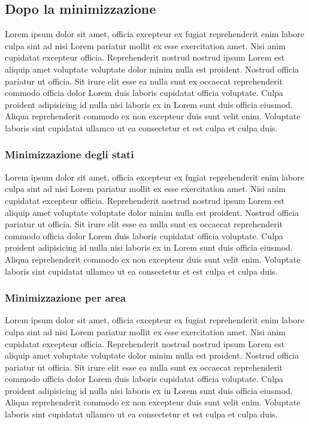 \documentclass[a4paper]{article}
\begin{document}
\subsection{Dopo la minimizzazione}
Lorem ipsum dolor sit amet, officia excepteur ex fugiat reprehenderit enim labore culpa sint ad nisi Lorem pariatur mollit ex esse exercitation amet. Nisi anim cupidatat excepteur officia. Reprehenderit nostrud nostrud ipsum Lorem est aliquip amet voluptate voluptate dolor minim nulla est proident. Nostrud officia pariatur ut officia. Sit irure elit esse ea nulla sunt ex occaecat reprehenderit commodo officia dolor Lorem duis laboris cupidatat officia voluptate. Culpa proident adipisicing id nulla nisi laboris ex in Lorem sunt duis officia eiusmod. Aliqua reprehenderit commodo ex non excepteur duis sunt velit enim. Voluptate laboris sint cupidatat ullamco ut ea consectetur et est culpa et culpa duis.

\subsubsection{Minimizzazione degli stati}
Lorem ipsum dolor sit amet, officia excepteur ex fugiat reprehenderit enim labore culpa sint ad nisi Lorem pariatur mollit ex esse exercitation amet. Nisi anim cupidatat excepteur officia. Reprehenderit nostrud nostrud ipsum Lorem est aliquip amet voluptate voluptate dolor minim nulla est proident. Nostrud officia pariatur ut officia. Sit irure elit esse ea nulla sunt ex occaecat reprehenderit commodo officia dolor Lorem duis laboris cupidatat officia voluptate. Culpa proident adipisicing id nulla nisi laboris ex in Lorem sunt duis officia eiusmod. Aliqua reprehenderit commodo ex non excepteur duis sunt velit enim. Voluptate laboris sint cupidatat ullamco ut ea consectetur et est culpa et culpa duis.

\subsubsection{Minimizzazione per area}
Lorem ipsum dolor sit amet, officia excepteur ex fugiat reprehenderit enim labore culpa sint ad nisi Lorem pariatur mollit ex esse exercitation amet. Nisi anim cupidatat excepteur officia. Reprehenderit nostrud nostrud ipsum Lorem est aliquip amet voluptate voluptate dolor minim nulla est proident. Nostrud officia pariatur ut officia. Sit irure elit esse ea nulla sunt ex occaecat reprehenderit commodo officia dolor Lorem duis laboris cupidatat officia voluptate. Culpa proident adipisicing id nulla nisi laboris ex in Lorem sunt duis officia eiusmod. Aliqua reprehenderit commodo ex non excepteur duis sunt velit enim. Voluptate laboris sint cupidatat ullamco ut ea consectetur et est culpa et culpa duis.
\end{document}
